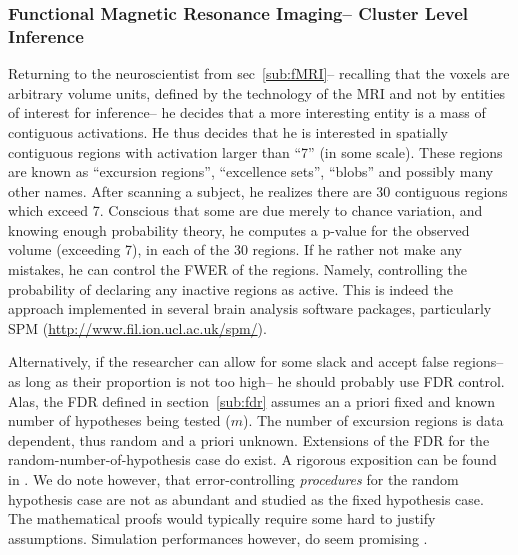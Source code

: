 \documentclass[review,12pt]{article}
\begin{document}
\subsubsection{Functional Magnetic Resonance Imaging-- Cluster Level Inference}

Returning to the neuroscientist from sec~\ref{sub:fMRI}-- recalling that the voxels are arbitrary volume units, defined by the technology of the MRI and not by entities of interest for inference-- he decides that a more interesting entity is a mass of contiguous activations. He thus decides that he is interested in spatially contiguous regions with activation larger than ``7'' (in some scale). These regions are known as ``excursion regions'', ``excellence sets'', ``blobs'' and possibly many other names. 
After scanning a subject, he realizes there are 30 contiguous regions which exceed 7. Conscious that some are  due merely to chance variation, and knowing enough probability theory, he computes a p-value for the observed volume (exceeding 7), in each of the 30 regions. If he rather not make any mistakes, he can control the FWER of the regions. Namely, controlling the probability of declaring any inactive regions as active. This is indeed the approach implemented in several brain analysis software packages, particularly SPM (\url{http://www.fil.ion.ucl.ac.uk/spm/}).

Alternatively, if the researcher can allow for some slack and accept false regions-- as long as their proportion is not too high-- he should probably use FDR control. Alas, the FDR defined in section~\ref{sub:fdr} assumes an a priori fixed and known number of hypotheses being tested ($m$). The number of excursion regions is data dependent, thus random and a priori unknown. Extensions of the FDR for the random-number-of-hypothesis case do exist. A rigorous exposition can be found in  \citet{siegmund_false_2011}. We do note however, that error-controlling \emph{procedures} for the random hypothesis case are not as abundant and studied as the fixed hypothesis case. The mathematical proofs would typically require some hard to justify assumptions. Simulation performances however, do seem promising \citep{chumbley_false_2009,chumbley_topological_2010}.
\end{document}
